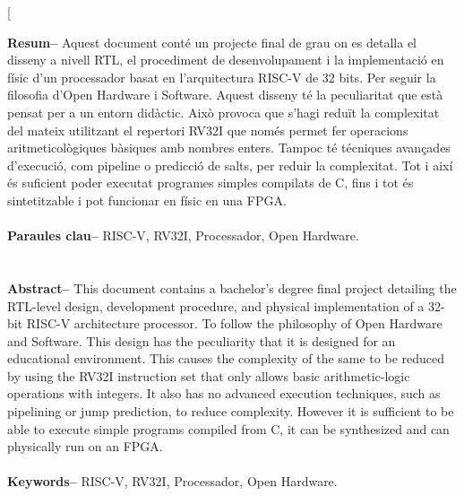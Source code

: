 \documentclass[10pt,a4paper,twocolumn,twoside]{article}
\begin{document}
\twocolumn[\begin{@twocolumnfalse}


\maketitle

\thispagestyle{primerapagina}
\begin{center}
\parbox{0.915\textwidth}
{\sffamily
\textbf{Resum--}
Aquest document conté un projecte final de grau on es detalla el disseny a nivell RTL, el procediment de desenvolupament i la implementació en físic d'un processador basat en l'arquitectura RISC-V de 32 bits. Per seguir la filosofia d'Open Hardware i Software. Aquest disseny té la peculiaritat que està pensat per a un entorn didàctic. Això provoca que s'hagi reduït la complexitat del mateix utilitzant el repertori RV32I que només permet fer operacions aritmeticològiques bàsiques amb nombres enters. Tampoc té técniques avançades d'execució, com pipeline o predicció de salts, per reduir la complexitat. Tot i així és suficient poder executat programes simples compilats de C, fins i tot és sintetitzable i pot funcionar en físic en una FPGA.
\\
\\
\textbf{Paraules clau-- } RISC-V, RV32I, Processador, Open Hardware. \\
\\
\bigskip
\\
\textbf{Abstract--} This document contains a bachelor's degree final project detailing the RTL-level design, development procedure, and physical implementation of a 32-bit RISC-V architecture processor. To follow the philosophy of Open Hardware and Software. This design has the peculiarity that it is designed for an educational environment. This causes the complexity of the same to be reduced by using the RV32I instruction set that only allows basic arithmetic-logic operations with integers. It also has no advanced execution techniques, such as pipelining or jump prediction, to reduce complexity. However it is sufficient to be able to execute simple programs compiled from C, it can be synthesized and can physically run on an FPGA. 
\\
\\
\textbf{Keywords-- } RISC-V, RV32I, Processador, Open Hardware.\\
}


\end{center}
\end{@twocolumnfalse}
\end{document}
